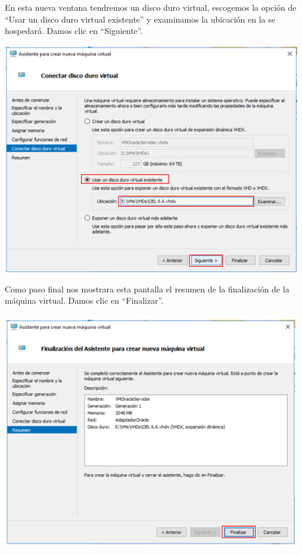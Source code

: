 \vspace{\baselineskip}

En esta nueva ventana tendremos un disco duro virtual, escogemos la opción de “Usar un disco duro virtual existente” y examinamos la ubicación en la se hospedará.  Damos clic en “Siguiente”.
	\begin{center}
		\includegraphics[width=13cm]{./Imagenes/20} 
	\end{center} 

\vspace{\baselineskip}

Como paso final nos mostrara esta pantalla el resumen de la finalización de la máquina virtual. Damos clic en “Finalizar”.
	\begin{center}
		\includegraphics[width=13cm]{./Imagenes/21} 
	\end{center} 

